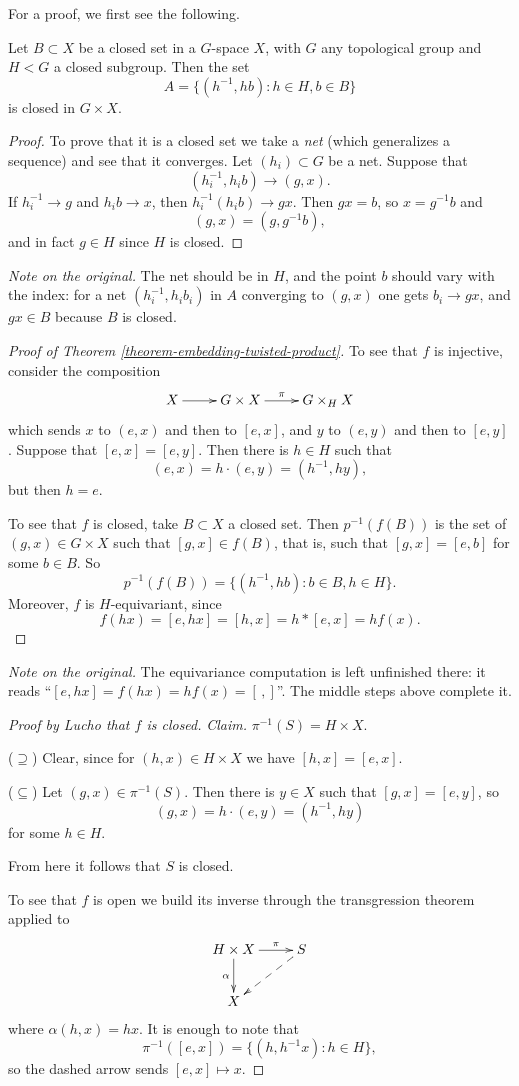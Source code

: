 For a proof, we first see the
following.

\begin{proposition}
\label{proposition-closed-set-in-product}
Let $B\subset X$ be a closed set in a
$G$-space $X$, with $G$ any topological
group and $H<G$ a closed subgroup.
Then the set
$$
A=\{(h^{-1},hb):h\in H,b\in B\}
$$
is closed in $G\times X$.
\end{proposition}

\begin{proof}
To prove that it is a closed set we
take a {\it net} (which generalizes a
sequence) and see that it converges.
Let $(h_i)\subset G$ be a net. Suppose
that
$$
(h_i^{-1},h_ib)\to(g,x).
$$
If $h_i^{-1}\to g$ and $h_ib\to x$,
then $h_i^{-1}(h_ib)\to gx$. Then
$gx=b$, so $x=g^{-1}b$ and
$$
(g,x)=(g,g^{-1}b),
$$
and in fact $g\in H$ since $H$ is
closed.
\end{proof}

\noindent
{\it Note on the original.} The net
should be in $H$, and the point $b$
should vary with the index: for a net
$(h_i^{-1},h_ib_i)$ in $A$ converging
to $(g,x)$ one gets $b_i\to gx$, and
$gx\in B$ because $B$ is closed.

\begin{proof}[Proof of Theorem
\ref{theorem-embedding-twisted-product}]
To see that $f$ is injective, consider
the composition
$$
\xymatrix{
X \ar[r] & G\times X \ar[r]^-{\pi}
  & G\times_HX
}
$$
which sends $x$ to $(e,x)$ and then to
$[e,x]$, and $y$ to $(e,y)$ and then to
$[e,y]$. Suppose that $[e,x]=[e,y]$.
Then there is $h\in H$ such that
$$
(e,x)=h\cdot(e,y)=(h^{-1},hy),
$$
but then $h=e$.

To see that $f$ is closed, take
$B\subset X$ a closed set. Then
$p^{-1}(f(B))$ is the set of
$(g,x)\in G\times X$ such that
$[g,x]\in f(B)$, that is, such that
$[g,x]=[e,b]$ for some $b\in B$. So
$$
p^{-1}\left(f(B)\right)
=\{(h^{-1},hb):b\in B,h\in H\}.
$$
Moreover, $f$ is $H$-equivariant, since
$$
f(hx)=[e,hx]=[h,x]=h*[e,x]=hf(x).
$$
\end{proof}

\noindent
{\it Note on the original.} The
equivariance computation is left
unfinished there: it reads
``$[e,hx]=f(hx)=hf(x)=[\,,]$''. The
middle steps above complete it.

\begin{proof}[Proof by Lucho that $f$
is closed]
{\it Claim.}
$\pi^{-1}(S)=H\times X$.

($\supseteq$) Clear, since for
$(h,x)\in H\times X$ we have
$[h,x]=[e,x]$.

($\subseteq$) Let
$(g,x)\in\pi^{-1}(S)$. Then there is
$y\in X$ such that $[g,x]=[e,y]$, so
$$
(g,x)=h\cdot(e,y)=(h^{-1},hy)
$$
for some $h\in H$.

From here it follows that $S$ is
closed.

To see that $f$ is open we build its
inverse through the transgression
theorem applied to
$$
\xymatrix{
H\times X \ar[r]^-{\pi}
  \ar[d]_{\alpha}
  & S \ar@{-->}[dl] \\
X
}
$$
where $\alpha(h,x)=hx$. It is enough to
note that
$$
\pi^{-1}([e,x])
=\{(h,h^{-1}x):h\in H\},
$$
so the dashed arrow sends
$[e,x]\mapsto x$.
\end{proof}

